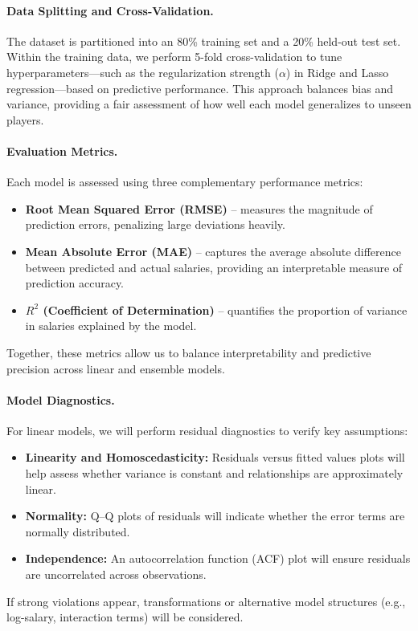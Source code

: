 \documentclass{article}
\theoremstyle{plain}
\theoremstyle{definition}
\theoremstyle{remark}
\begin{document}
\paragraph{Data Splitting and Cross-Validation.}
The dataset is partitioned into an 80\% training set and a 20\% held-out test set. Within the training data, we perform 5-fold cross-validation to tune hyperparameters—such as the regularization strength ($\alpha$) in Ridge and Lasso regression—based on predictive performance. This approach balances bias and variance, providing a fair assessment of how well each model generalizes to unseen players.

\paragraph{Evaluation Metrics.}
Each model is assessed using three complementary performance metrics:
\begin{itemize}
    \item \textbf{Root Mean Squared Error (RMSE)} – measures the magnitude of prediction errors, penalizing large deviations heavily.
    \item \textbf{Mean Absolute Error (MAE)} – captures the average absolute difference between predicted and actual salaries, providing an interpretable measure of prediction accuracy.
    \item \textbf{$R^2$ (Coefficient of Determination)} – quantifies the proportion of variance in salaries explained by the model.
\end{itemize}
Together, these metrics allow us to balance interpretability and predictive precision across linear and ensemble models.

\paragraph{Model Diagnostics.}
For linear models, we will perform residual diagnostics to verify key assumptions:
\begin{itemize}
    \item \textbf{Linearity and Homoscedasticity:} Residuals versus fitted values plots will help assess whether variance is constant and relationships are approximately linear.
    \item \textbf{Normality:} Q–Q plots of residuals will indicate whether the error terms are normally distributed.
    \item \textbf{Independence:} An autocorrelation function (ACF) plot will ensure residuals are uncorrelated across observations.
\end{itemize}
If strong violations appear, transformations or alternative model structures (e.g., log-salary, interaction terms) will be considered.
\end{document}
